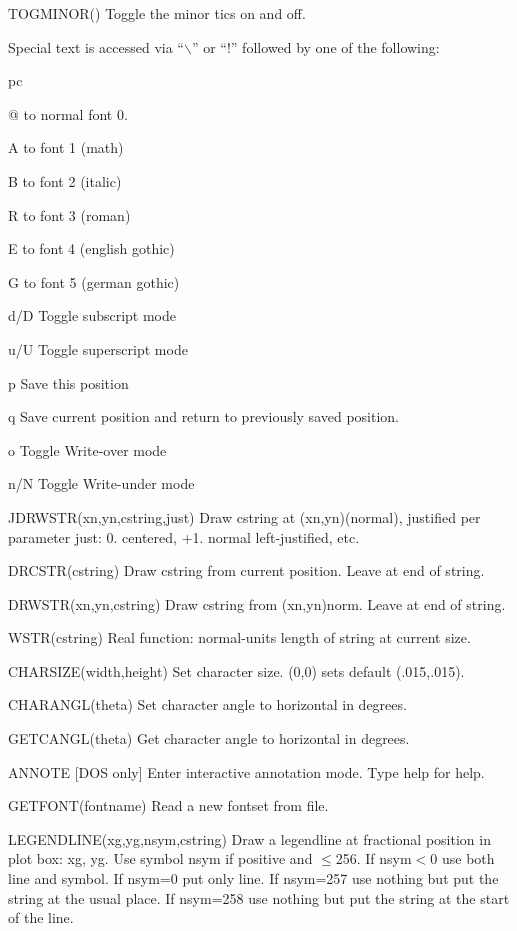 TOGMINOR() Toggle the minor tics on and off.



\iftth {} \fi

Special text is accessed via ``$\backslash$'' or ``!'' followed by one of 
the following:
{ pc
\item{@}       to normal font 0.
\item{A}       to font 1 (math)
\item{B}       to font 2 (italic)
\item{R}       to font 3 (roman)
\item{E}       to font 4 (english gothic)
\item{G}       to font 5 (german gothic)
\item{d/D}       Toggle subscript mode
\item{u/U}       Toggle superscript mode
\item{p}         Save this position
\item{q}         Save current position and return to previously saved
position.
\item{o}        Toggle Write-over mode
\item{n/N}      Toggle Write-under mode
}

JDRWSTR(xn,yn,cstring,just) Draw cstring at (xn,yn)(normal), justified
per parameter just:  0. centered, +1. normal left-justified, etc.

DRCSTR(cstring) Draw cstring from current position. Leave at end of string.

DRWSTR(xn,yn,cstring) Draw cstring from (xn,yn)norm. Leave at end of
string.

WSTR(cstring) Real function: normal-units length of string at current size.

CHARSIZE(width,height) Set character size. (0,0) sets default (.015,.015).

CHARANGL(theta) Set character angle to horizontal in degrees.

GETCANGL(theta) Get character angle to horizontal in degrees.

ANNOTE [DOS only] Enter interactive annotation mode. Type help for help.

GETFONT(fontname) Read a new fontset from file.

LEGENDLINE(xg,yg,nsym,cstring) Draw a legendline at fractional
position in plot box: xg, yg.  Use symbol nsym if positive and $\le$256.
If nsym$<$0 use both line and symbol. If nsym=0 put only line.  
If nsym=257 use nothing but put the string at the usual place.
If nsym=258 use nothing but put the string at the start of the line.

